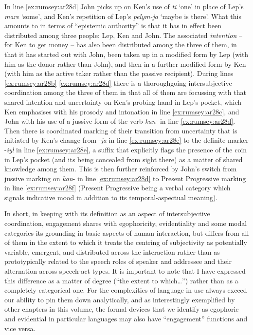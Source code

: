\documentclass[output=paper]{langsci/langscibook}
\begin{document}
In line \ref{ex:rumsey:ar28d} John picks up on Ken’s use of \textit{ti} ‘one’ in place of Lep’s \textit{mare} ‘some’, and Ken’s repetition of Lep’s \textit{pelym-ja} ‘maybe is there’. What this amounts to in terms of “epistemic authority” is that it has in effect been distributed among three people:  Lep, Ken and John. The associated \textit{intention}  – for Ken to get money – has also been distributed among the three of them, in that it has started out with John, been taken up in a modified form by Lep (with him as the donor rather than John), and then in a further modified form by Ken (with him as the active taker rather than the passive recipient). During lines \ref{ex:rumsey:ar28b}-\ref{ex:rumsey:ar28d} there is a thoroughgoing  intersubjective coordination among the three of them in that all of them are focussing with that shared intention and uncertainty on Ken’s probing hand in Lep’s pocket, which Ken emphasises with his prosody and intonation in line \ref{ex:rumsey:ar28c}, and John with his use of a jussive form of the verb \textit{kan}- in line \ref{ex:rumsey:ar28d}. Then there is coordinated marking of their transition from uncertainty that is initiated by Ken’s change from -\textit{ja} in line \ref{ex:rumsey:ar28e} to the definite marker -\textit{iyl} in line \ref{ex:rumsey:ar28e},  a suffix that explicitly flags the presence of the coin in Lep’s pocket (and its being concealed from sight there) as a matter of shared knowledge among them. This is then further reinforced by John’s switch from jussive marking on \textit{kan}- in line \ref{ex:rumsey:ar28d} to Present Progressive marking in line \ref{ex:rumsey:ar28f}  (Present Progressive being a verbal category which signals indicative mood in addition to its temporal-aspectual meaning).

In short, in keeping with its definition as an aspect of intersubjective coordination, engagement shares with egophoricity, evidentiality and some modal categories its grounding in basic aspects of human interaction, but differs from all of them in the extent to which it treats the centring of subjectivity as potentially variable, emergent,  and distributed across the interaction rather than as prototypically related to the speech roles of speaker and addressee and their alternation across speech-act types. It is important to note that I have expressed this difference as a matter of degree (“the extent to which…”) rather than as a completely categorical one. For the complexities of language in use always exceed our ability to pin them down analytically, and as interestingly exemplified by other chapters in this volume, the formal devices that we identify as egophoric and evidential in particular languages may also have “engagement” functions and vice versa.
\end{document}
